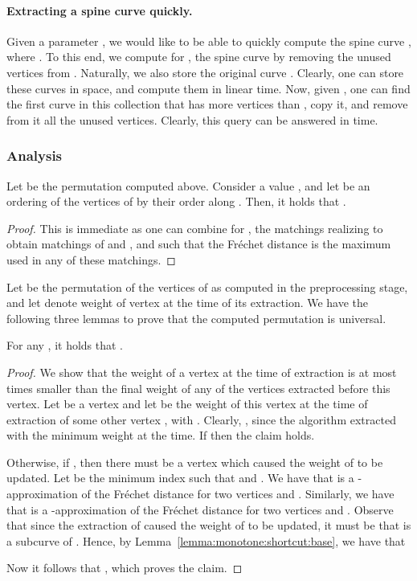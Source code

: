 \documentclass[12pt]{article}
\newcommand{\lemlab}[1]{\label{lemma:#1}}
\newcommand{\lemref}[1]{Lemma~\ref{lemma:#1}}
\newcommand{\Frechet}{Fr\'{e}c{h}e{}t\xspace}\providecommand{\Arr}{\mathop{\mathrm{\EuScript{A}}}}
\numberwithin{figure}{section}
\numberwithin{equation}{section}
\newcommand{\matching}{matching\xspace}
\begin{document}
\paragraph{Extracting a spine curve quickly.}
Given a parameter , we would like to be able to quickly compute the
spine curve , where . To this end, we compute for , the spine curve  by removing the unused
vertices from .  Naturally, we also store
the original curve . Clearly, one can store these 
curves in  space, and compute them in linear time. Now, given
, one can find the first curve in this collection that has more
vertices than , copy it, and remove from it all the unused
vertices. Clearly, this query can be answered in  time.


\subsubsection{Analysis}


\begin{lemma}\lemlab{spine:curve:f:r}Let  be the permutation computed
    above. Consider a value , and let  be an ordering of the vertices of  by their order along . Then, it holds that
    .
\end{lemma}
\begin{proof}
    This is immediate as one can combine for , the
    \matching{}s realizing  to obtain \matching{}s of
     and , and such that the \Frechet distance
    is the maximum used in any of these \matching{}s.
\end{proof}


Let  be the permutation of the vertices of 
as computed in the preprocessing stage, and let  denote
weight of vertex  at the time of its extraction.  We have the
following three lemmas to prove that the computed permutation is
universal.

\begin{lemma}\lemlab{universal:0}For any , it holds that .
\end{lemma}
\begin{proof}
    We show that the weight of a vertex at the time of extraction is
    at most  times smaller than the final weight of any of the
    vertices extracted before this vertex.  Let  be a vertex
    and let  be the weight of this vertex at
    the time of extraction of some other vertex , with . Clearly, , since the algorithm extracted 
    with the minimum weight at the time.  If  then the claim
    holds.
    
    Otherwise, if , then there must be a vertex which caused
    the weight of  to be updated. Let  be the minimum index
    such that  and
    .  We have that
     is a -approximation of the \Frechet distance
     for
    two vertices  and .  Similarly, we have that
     is a -approximation of the
    \Frechet distance
     for
    two vertices  and .  Observe that since the
    extraction of  caused the weight of  to be
    updated, it must be that  is a
    subcurve of .  Hence, by
    \lemref{monotone:shortcut:base}, we have that
    
    Now it follows that , which proves the claim.
\end{proof}
\end{document}
